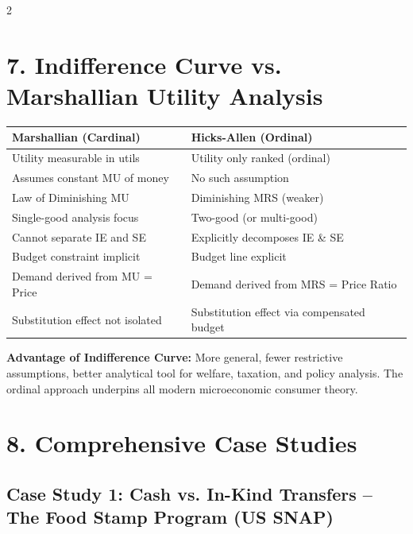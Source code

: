 \documentclass[10pt,a4paper]{article}
\begin{document}
\begin{multicols}{2}
\section*{7. Indifference Curve vs. Marshallian Utility Analysis}

\begin{center}
\begin{tabular}{@{}p{2.8cm}p{2.8cm}@{}}
\toprule
\textbf{Marshallian (Cardinal)} & \textbf{Hicks-Allen (Ordinal)} \\
\midrule
Utility measurable in utils & Utility only ranked (ordinal) \\
Assumes constant MU of money & No such assumption \\
Law of Diminishing MU & Diminishing MRS (weaker) \\
Single-good analysis focus & Two-good (or multi-good) \\
Cannot separate IE and SE & Explicitly decomposes IE \& SE \\
Budget constraint implicit & Budget line explicit \\
Demand derived from MU = Price & Demand derived from MRS = Price Ratio \\
Substitution effect not isolated & Substitution effect via compensated budget \\
\bottomrule
\end{tabular}
\end{center}

\textbf{Advantage of Indifference Curve:} More general, fewer restrictive assumptions, better analytical tool for welfare, taxation, and policy analysis. The ordinal approach underpins all modern microeconomic consumer theory.

\section*{8. Comprehensive Case Studies}

\subsection*{Case Study 1: Cash vs. In-Kind Transfers -- The Food Stamp Program (US SNAP)}


\end{multicols}
\end{document}
